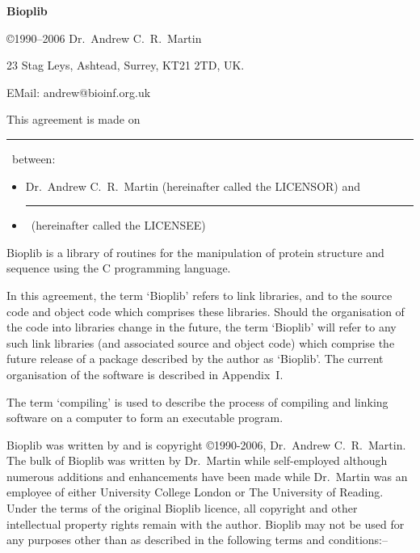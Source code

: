 \documentclass[12pt]{article}
\newcommand{\licensee}{\rule{5.3in}{0.5pt}\mbox{}}
\renewcommand{\date}{\rule{1.5in}{0.5pt}\mbox{}}
\begin{document}
% 
% 
% 
% 
% 
% 
% 

\begin{center}
{\large\bfseries Bioplib}

\copyright 1990--2006 Dr.\ Andrew C.\ R.\ Martin

23 Stag Leys, Ashtead, Surrey, KT21 2TD, UK.

EMail: andrew@bioinf.org.uk

\end{center}
\vspace{1em}

This agreement is made on \date\ between:
\begin{itemize}
\item Dr.\ Andrew C.\ R.\ Martin (hereinafter called the LICENSOR) and
\item \licensee\ (hereinafter called the LICENSEE)
\end{itemize}

Bioplib is a library of routines for the manipulation of protein
structure and sequence using the C programming language. 

In this agreement, the term `Bioplib' refers to link libraries, and to
the source code and object code which comprises these
libraries. Should the organisation of the code into libraries change
in the future, the term `Bioplib' will refer to any such link
libraries (and associated source and object code) which comprise the
future release of a package described by the author as `Bioplib'.
The current organisation of the software is described in Appendix~I.

The term `compiling' is used to describe the process of compiling and
linking software on a computer to form an executable program.

Bioplib was written by and is copyright \copyright 1990-2006, Dr.\
Andrew C.\ R.\ Martin. The bulk of Bioplib was written by Dr.\ Martin
while self-employed although numerous additions and enhancements have
been made while Dr.\ Martin was an employee of either University
College London or The University of Reading. Under the terms of the
original Bioplib licence, all copyright and other intellectual
property rights remain with the author. Bioplib may not be used for
any purposes other than as described in the following terms and
conditions:--
\end{document}
